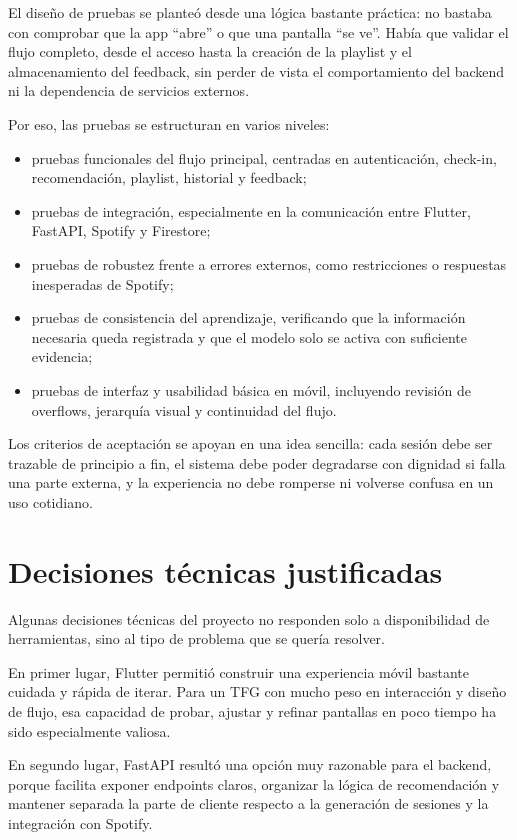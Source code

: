El diseño de pruebas se planteó desde una lógica bastante práctica: no bastaba
con comprobar que la app ``abre'' o que una pantalla ``se ve''. Había que
validar el flujo completo, desde el acceso hasta la creación de la playlist y
el almacenamiento del feedback, sin perder de vista el comportamiento del
backend ni la dependencia de servicios externos.

Por eso, las pruebas se estructuran en varios niveles:

\begin{itemize}
    \item pruebas funcionales del flujo principal, centradas en autenticación, check-in, recomendación, playlist, historial y feedback;
    \item pruebas de integración, especialmente en la comunicación entre Flutter, FastAPI, Spotify y Firestore;
    \item pruebas de robustez frente a errores externos, como restricciones o respuestas inesperadas de Spotify;
    \item pruebas de consistencia del aprendizaje, verificando que la información necesaria queda registrada y que el modelo solo se activa con suficiente evidencia;
    \item pruebas de interfaz y usabilidad básica en móvil, incluyendo revisión de overflows, jerarquía visual y continuidad del flujo.
\end{itemize}

Los criterios de aceptación se apoyan en una idea sencilla: cada sesión debe
ser trazable de principio a fin, el sistema debe poder degradarse con dignidad
si falla una parte externa, y la experiencia no debe romperse ni volverse
confusa en un uso cotidiano.

\section{Decisiones técnicas justificadas}
\label{sec:decisiones_tecnicas}

Algunas decisiones técnicas del proyecto no responden solo a disponibilidad de
herramientas, sino al tipo de problema que se quería resolver.

En primer lugar, Flutter permitió construir una experiencia móvil bastante
cuidada y rápida de iterar. Para un TFG con mucho peso en interacción y diseño
de flujo, esa capacidad de probar, ajustar y refinar pantallas en poco tiempo
ha sido especialmente valiosa.

En segundo lugar, FastAPI resultó una opción muy razonable para el backend,
porque facilita exponer endpoints claros, organizar la lógica de recomendación
y mantener separada la parte de cliente respecto a la generación de sesiones y
la integración con Spotify.

